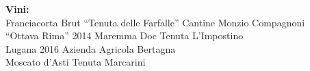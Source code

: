 \documentclass[11pt]{book}
\begin{document}
\noindent\scriptsize\textbf{Vini:}\\
Franciacorta Brut “Tenuta delle Farfalle” Cantine Monzio Compagnoni\\
“Ottava Rima” 2014 Maremma Doc Tenuta L’Impostino\\
Lugana 2016 Azienda Agricola Bertagna\\
Moscato d’Asti Tenuta Marcarini\\

\begin{figure}[h!]
\centering
\def\svgscale{0.5}
\end{figure}
\end{document}
